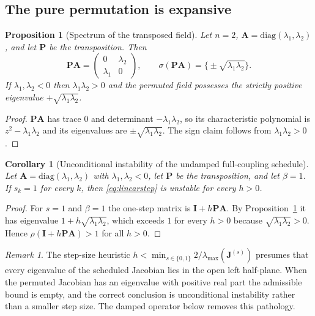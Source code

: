 \documentclass[12pt, a4paper]{article}
\theoremstyle{plain}
\newtheorem{proposition}{Proposition}
\newtheorem{corollary}{Corollary}
\theoremstyle{definition}
\theoremstyle{remark}
\newtheorem{remark}{Remark}
\newcommand{\bI}{\mathbf{I}}
\newcommand{\bP}{\mathbf{P}}
\newcommand{\bA}{\mathbf{A}}
\newcommand{\bJ}{\mathbf{J}}
\begin{document}
\subsection{The pure permutation is expansive}

\begin{proposition}[Spectrum of the transposed field]
\label{prop:spectrum}
Let $n=2$, $\bA = \mathrm{diag}(\lambda_1,\lambda_2)$, and let $\bP$ be the
transposition. Then
\begin{equation}
\bP\bA = \begin{pmatrix} 0 & \lambda_2 \\ \lambda_1 & 0 \end{pmatrix},
\qquad
\sigma(\bP\bA) = \big\{\pm\sqrt{\lambda_1\lambda_2}\big\}.
\end{equation}
If $\lambda_1,\lambda_2<0$ then $\lambda_1\lambda_2>0$ and the permuted field
possesses the strictly positive eigenvalue $+\sqrt{\lambda_1\lambda_2}$.
\end{proposition}

\begin{proof}
$\bP\bA$ has trace $0$ and determinant $-\lambda_1\lambda_2$, so its
characteristic polynomial is $z^2 - \lambda_1\lambda_2$ and its eigenvalues
are $\pm\sqrt{\lambda_1\lambda_2}$. The sign claim follows from
$\lambda_1\lambda_2>0$.
\end{proof}

\begin{corollary}[Unconditional instability of the undamped full-coupling schedule]
\label{cor:unstable}
Let $\bA = \mathrm{diag}(\lambda_1,\lambda_2)$ with $\lambda_1,\lambda_2<0$,
let $\bP$ be the transposition, and let $\beta = 1$. If $s_k = 1$ for every
$k$, then \eqref{eq:linearstep} is unstable for every $h>0$.
\end{corollary}

\begin{proof}
For $s=1$ and $\beta=1$ the one-step matrix is $\bI + h\bP\bA$. By
Proposition~\ref{prop:spectrum} it has eigenvalue
$1 + h\sqrt{\lambda_1\lambda_2}$, which exceeds $1$ for every $h>0$ because
$\sqrt{\lambda_1\lambda_2}>0$. Hence $\rho(\bI+h\bP\bA)>1$ for all $h>0$.
\end{proof}

\begin{remark}
The step-size heuristic
$h < \min_{s\in\{0,1\}} 2/\lambda_{\max}(\bJ^{(s)})$ presumes that every
eigenvalue of the scheduled Jacobian lies in the open left half-plane. When
the permuted Jacobian has an eigenvalue with positive real part the admissible
bound is empty, and the correct conclusion is unconditional instability rather
than a smaller step size. The damped operator below removes this pathology.
\end{remark}
\end{document}
